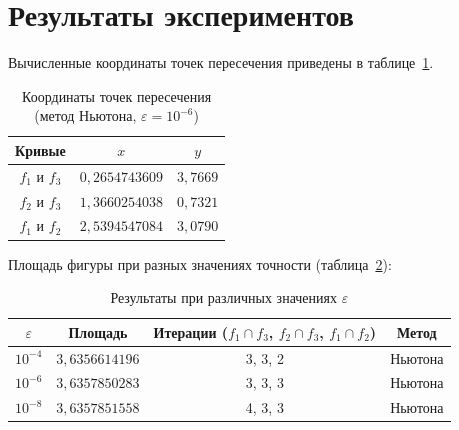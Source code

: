 \documentclass[a4paper,12pt,titlepage,finall]{article}
\begin{document}
\newpage

\section{Результаты экспериментов}

Вычисленные координаты точек пересечения приведены в таблице~\ref{table1}.

\begin{table}[h]
\centering
\begin{tabular}{|c|c|c|}
\hline
Кривые & $x$ & $y$ \\
\hline
$f_1$ и $f_3$ & $0{,}2654743609$ & $3{,}7669$ \\
$f_2$ и $f_3$ & $1{,}3660254038$ & $0{,}7321$ \\
$f_1$ и $f_2$ & $2{,}5394547084$ & $3{,}0790$ \\
\hline
\end{tabular}
\caption{Координаты точек пересечения (метод Ньютона, $\varepsilon = 10^{-6}$)}
\label{table1}
\end{table}

Площадь фигуры при разных значениях точности (таблица~\ref{table2}):

\begin{table}[h]
\centering
\begin{tabular}{|c|c|c|c|}
\hline
$\varepsilon$ & Площадь & Итерации ($f_1{\cap}f_3$, $f_2{\cap}f_3$, $f_1{\cap}f_2$) & Метод \\
\hline
$10^{-4}$ & $3{,}6356614196$ & 3, 3, 2 & Ньютона \\
$10^{-6}$ & $3{,}6357850283$ & 3, 3, 3 & Ньютона \\
$10^{-8}$ & $3{,}6357851558$ & 4, 3, 3 & Ньютона \\
\hline
\end{tabular}
\caption{Результаты при различных значениях $\varepsilon$}
\label{table2}
\end{table}
\end{document}
